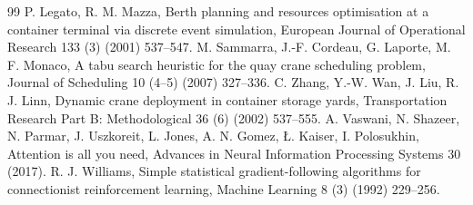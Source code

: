 \documentclass[11pt,a4paper]{elsarticle}
\begin{document}
\begin{thebibliography}{99}
 P. Legato, R. M. Mazza, Berth planning and resources optimisation at a container terminal via discrete event simulation, European Journal of Operational Research 133 (3) (2001) 537--547.
 M. Sammarra, J.-F. Cordeau, G. Laporte, M. F. Monaco, A tabu search heuristic for the quay crane scheduling problem, Journal of Scheduling 10 (4--5) (2007) 327--336.
 C. Zhang, Y.-W. Wan, J. Liu, R. J. Linn, Dynamic crane deployment in container storage yards, Transportation Research Part B: Methodological 36 (6) (2002) 537--555.
 A. Vaswani, N. Shazeer, N. Parmar, J. Uszkoreit, L. Jones, A. N. Gomez, {\L}. Kaiser, I. Polosukhin, Attention is all you need, Advances in Neural Information Processing Systems 30 (2017).
 R. J. Williams, Simple statistical gradient-following algorithms for connectionist reinforcement learning, Machine Learning 8 (3) (1992) 229--256.
\end{thebibliography}
\end{document}
